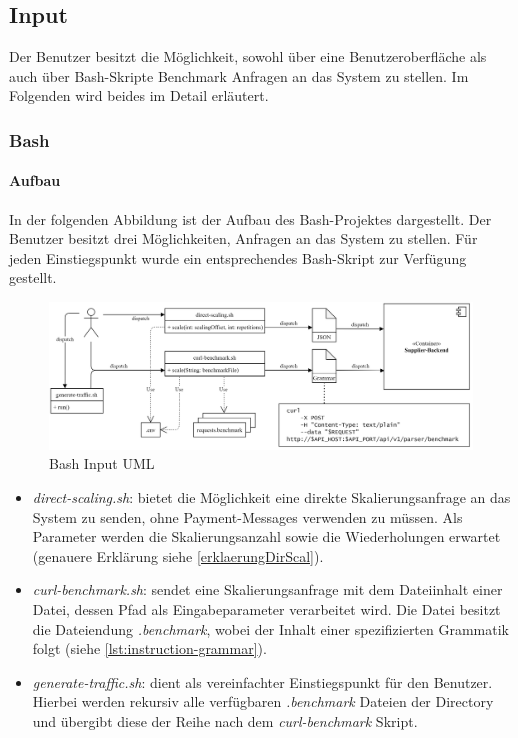 \subsection{Input \checkmark}

Der Benutzer besitzt die Möglichkeit, sowohl über eine Benutzeroberfläche als auch über Bash-Skripte Benchmark Anfragen an das System zu stellen. Im Folgenden wird beides im Detail erläutert.

\subsubsection{Bash \checkmark}
\label{ss:bash}

\paragraph{Aufbau \checkmark}
In der folgenden Abbildung ist der Aufbau des Bash-Projektes dargestellt. Der Benutzer besitzt drei Möglichkeiten, Anfragen an das System zu stellen. Für jeden Einstiegspunkt wurde ein entsprechendes Bash-Skript zur Verfügung gestellt.

\begin{figure}[ht!]
	\centering
	\includegraphics[width=\linewidth]{kapitel/problemloesung/implementierung/_img/input-uml}
	\caption[Bash Input UML]{Bash Input UML}
	\label{fig:bashOverview}
\end{figure}

\begin{itemize}
  \item \emph{direct-scaling.sh}: bietet die Möglichkeit eine direkte Skalierungsanfrage an das System zu senden, ohne Payment-Messages verwenden zu müssen. Als Parameter werden die Skalierungsanzahl sowie die Wiederholungen erwartet (genauere Erklärung siehe \ref{erklaerungDirScal}).
  \item \emph{curl-benchmark.sh}: sendet eine Skalierungsanfrage mit dem Dateiinhalt einer Datei, dessen Pfad als Eingabeparameter verarbeitet wird. Die Datei besitzt die Dateiendung \emph{.benchmark}, wobei der Inhalt einer spezifizierten Grammatik folgt (siehe \ref{lst:instruction-grammar}).
  \item \emph{generate-traffic.sh}: dient als vereinfachter Einstiegspunkt für den Benutzer. Hierbei werden rekursiv alle verfügbaren \emph{.benchmark} Dateien der Directory und übergibt diese der Reihe nach dem \emph{curl-benchmark} Skript.
\end{itemize}

